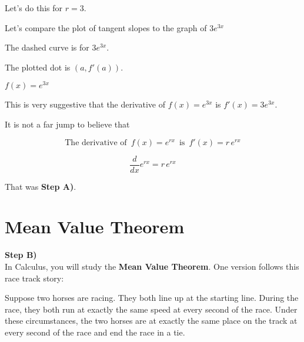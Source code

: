 \documentclass{ximera}
\begin{document}
Let's do this for $r = 3$.

\begin{example}



Let's compare the plot of tangent slopes to the graph of $3 e^{3 x}$


The dashed curve is for $3 e^{3 x}$.

The plotted dot is $(a, f'(a))$.

\begin{example}  $f(x) = e^{3 x}$

\begin{center}
\end{center}

\end{example}





This is very suggestive that the derivative of $f(x) = e^{3 x}$ is $f'(x) = 3 e^{3 x}$.



\end{example}





It is not a far jump to believe that 




\begin{idea}

\[
\text{The derivative of } \, f(x) = e^{r x} \, \text{ is } \, f'(x) = r \, e^{r x}
\]


\[
\frac{d}{dx} e^{r x}  = r \, e^{r x}
\]

\end{idea}



That was \textbf{\textcolor{purple!85!blue}{Step A)}}. \\





\section*{Mean Value Theorem}

\textbf{\textcolor{purple!85!blue}{Step B)}} \\

In Calculus, you will study the \textbf{Mean Value Theorem}. One version follows this race track story:


Suppose two horses are racing.  They both line up at the starting line.  During the race, they both run at exactly the same speed at every second of the race.  Under these circumstances, the two horses are at exactly the same place on the track at every second of the race and end the race in a tie.
\end{document}
